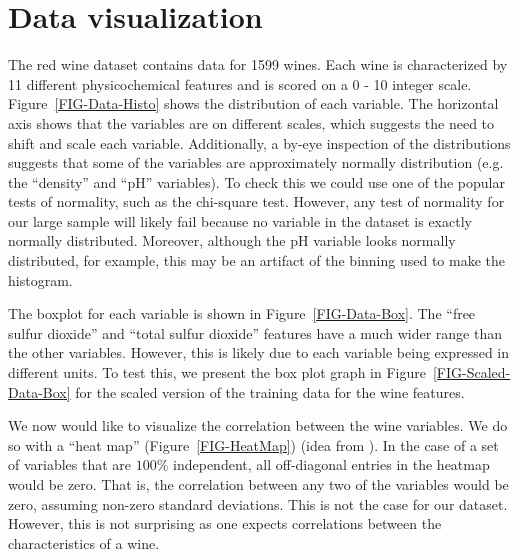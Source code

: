 \documentclass[12pt,preprint]{aastex61}
\begin{document}


\section{Data visualization \label{viz}}

The red wine dataset contains data for 1599 wines. Each wine is
characterized by 11 different physicochemical features and is scored
on a 0 - 10 integer scale.
Figure~\ref{FIG-Data-Histo} shows the distribution of each variable. The horizontal axis
shows that the variables are on different scales, which suggests
the need to shift and scale each variable. Additionally, a by-eye
inspection of the distributions suggests that some of the variables
are approximately normally distribution (e.g.  the ``density'' and
``pH'' variables). To check this we could use one of the popular tests of
normality, such as the chi-square test. However, any test of normality
for our large sample will likely fail because no variable in the
dataset is exactly normally distributed. Moreover, although the pH variable
looks normally distributed, for example, this may be an artifact of
the binning used to make the histogram.

The boxplot for each variable is shown in
Figure~\ref{FIG-Data-Box}. The ``free sulfur dioxide'' and ``total
sulfur dioxide'' features have a much wider range than the
other variables. However, this is likely due to each variable being
expressed in different units. To test this, we present the box plot
graph in Figure~\ref{FIG-Scaled-Data-Box} for the scaled version of
the training data for the wine features.

We now would like to visualize the correlation between the wine
variables. We do so with a ``heat map''  (Figure~\ref{FIG-HeatMap}) (idea from \citealp{Li_2017}).
In the case of a set of variables that are $100\%$ independent, 
all off-diagonal entries in the heatmap would be zero. That is,
the correlation between any two of the variables would be zero,
assuming non-zero standard deviations. This is not the case for our dataset.
However, this is not surprising as one expects correlations between
the characteristics of a wine.
\end{document}

